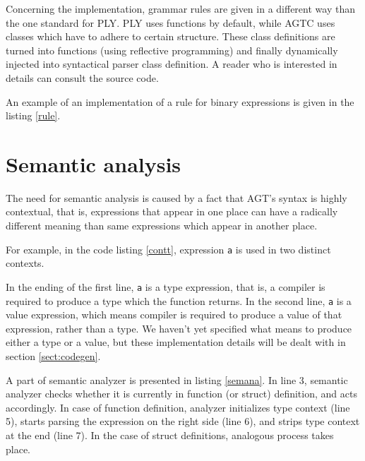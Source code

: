 \documentclass[times, utf8, diplomski]{fer}
\theoremstyle{definition}
\newcommand{\textcode}[3]{
    
}
\begin{document}
\textcode{\resdir/compiler/ast}{ast}{AST resulting from \texttt{let n = in<i32>();}}

Concerning the implementation, grammar rules are given in a different way than the
one standard for PLY. PLY uses functions by default, while AGTC uses
classes which have to adhere to certain structure. These class definitions
are turned into functions (using reflective programming) and finally
dynamically injected into syntactical parser class definition.
A reader who is interested in details can consult the source code.

An example of an implementation of a rule for binary expressions is given in the listing \ref{rule}.
\\

\textcode{\resdir/compiler/rule.py}{rule}{Binary expression rule implementation}

\section{Semantic analysis}

The need for semantic analysis is caused by a fact that AGT's syntax is highly contextual,
that is, expressions that appear in one place can have a radically different meaning
than same expressions which appear in another place.

For example, in the code listing \ref{contt}, expression \texttt{a} is used in two distinct contexts.

\textcode{\resdir/compiler/contextual.agt}{contt}{Contextuality of expression \texttt{a}}

In the ending of the first line, \texttt{a} is a type expression, that is, a
compiler is required to produce a type which the function returns. In the
second line, \texttt{a} is a value expression,
which means compiler is required to produce a value of that expression, rather than a type.
We haven't yet specified what means to produce either a type or a value, but these implementation
details will be dealt with in section \ref{sect:codegen}.

A part of semantic analyzer is presented in listing \ref{semana}.
In line 3, semantic analyzer checks whether it is currently in function (or struct) definition, 
and acts accordingly. In case of function definition, analyzer initializes type context (line 5),
starts parsing the expression on the right side (line 6), 
and strips type context at the end (line 7).
In the case of struct definitions, analogous process takes place.
\end{document}
